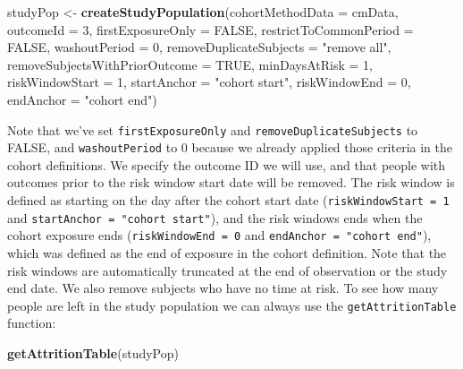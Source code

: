 \documentclass[11pt]{book}
\newenvironment{Shaded}{\begin{snugshade}}{\end{snugshade}}
\newcommand{\DataTypeTok}[1]{\textcolor[rgb]{0.13,0.29,0.53}{#1}}
\newcommand{\DecValTok}[1]{\textcolor[rgb]{0.00,0.00,0.81}{#1}}
\newcommand{\KeywordTok}[1]{\textcolor[rgb]{0.13,0.29,0.53}{\textbf{#1}}}
\newcommand{\NormalTok}[1]{#1}
\newcommand{\OtherTok}[1]{\textcolor[rgb]{0.56,0.35,0.01}{#1}}
\newcommand{\StringTok}[1]{\textcolor[rgb]{0.31,0.60,0.02}{#1}}
\theoremstyle{definition}
\theoremstyle{definition}
\theoremstyle{definition}
\theoremstyle{remark}
\begin{document}
\begin{Shaded}
\begin{Highlighting}[]
\NormalTok{studyPop <-}\StringTok{ }\KeywordTok{createStudyPopulation}\NormalTok{(}\DataTypeTok{cohortMethodData =}\NormalTok{ cmData,}
                                  \DataTypeTok{outcomeId =} \DecValTok{3}\NormalTok{,}
                                  \DataTypeTok{firstExposureOnly =} \OtherTok{FALSE}\NormalTok{,}
                                  \DataTypeTok{restrictToCommonPeriod =} \OtherTok{FALSE}\NormalTok{,}
                                  \DataTypeTok{washoutPeriod =} \DecValTok{0}\NormalTok{,}
                                  \DataTypeTok{removeDuplicateSubjects =} \StringTok{"remove all"}\NormalTok{,}
                                  \DataTypeTok{removeSubjectsWithPriorOutcome =} \OtherTok{TRUE}\NormalTok{,}
                                  \DataTypeTok{minDaysAtRisk =} \DecValTok{1}\NormalTok{,}
                                  \DataTypeTok{riskWindowStart =} \DecValTok{1}\NormalTok{,}
                                  \DataTypeTok{startAnchor =} \StringTok{"cohort start"}\NormalTok{,}
                                  \DataTypeTok{riskWindowEnd =} \DecValTok{0}\NormalTok{,}
                                  \DataTypeTok{endAnchor =} \StringTok{"cohort end"}\NormalTok{)}
\end{Highlighting}
\end{Shaded}

Note that we've set \texttt{firstExposureOnly} and \texttt{removeDuplicateSubjects} to FALSE, and \texttt{washoutPeriod} to 0 because we already applied those criteria in the cohort definitions. We specify the outcome ID we will use, and that people with outcomes prior to the risk window start date will be removed. The risk window is defined as starting on the day after the cohort start date (\texttt{riskWindowStart\ =\ 1} and \texttt{startAnchor\ =\ "cohort\ start"}), and the risk windows ends when the cohort exposure ends (\texttt{riskWindowEnd\ =\ 0} and \texttt{endAnchor\ =\ "cohort\ end"}), which was defined as the end of exposure in the cohort definition. Note that the risk windows are automatically truncated at the end of observation or the study end date. We also remove subjects who have no time at risk. To see how many people are left in the study population we can always use the \texttt{getAttritionTable} function:

\begin{Shaded}
\begin{Highlighting}[]
\KeywordTok{getAttritionTable}\NormalTok{(studyPop)}
\end{Highlighting}
\end{Shaded}
\end{document}
